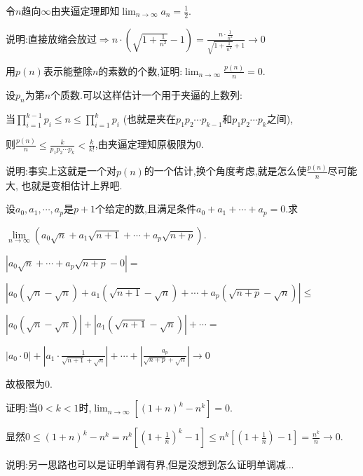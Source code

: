 \documentclass{exam}
\begin{document}
\begin{questions}
\begin{solution}
        令$n$趋向$\infty$由夹逼定理即知$\lim_{n\to\infty}a_n=\frac{1}{2}$.

        说明:直接放缩会放过$\Longrightarrow n\cdot\left(\sqrt{1+\frac{1}{n^2}}-1\right)=
        \frac{n\cdot\frac{1}{n^2}}{\sqrt{1+\frac{1}{n^2}}+1}\rightarrow 0$
    \end{solution}

    \question
    用$p(n)$表示能整除$n$的素数的个数,证明:$\lim _{n\to \infty}\frac{p(n)}{n}=0$.
    \begin{solution}
        设$p_n$为第$n$个质数.可以这样估计一个用于夹逼的上数列:

        当$\prod_{i=1}^{k-1}p_i\leqslant n\leqslant\prod_{i=1}^kp_i$
        (也就是夹在$p_1p_2\cdots p_{k-1}$和$p_1p_2\cdots p_k$之间),

        则$\frac{p(n)}{n}\leqslant \frac{k}{p_1p_2\cdots p_k}<\frac{k}{k!}$,由夹逼定理知原极限为0.

        说明:事实上这就是一个对$p(n)$的一个估计,换个角度考虑,就是怎么使$\frac{p(n)}{n}$尽可能大,
        也就是变相估计上界吧.
    \end{solution}
    
    \question
    设$a_0,a_1,\cdots,a_p$是$p+1$个给定的数,且满足条件$a_0+a_1+\cdots+a_p=0$.求

    $\lim\limits _{n\to \infty}\left(a_0\sqrt{n}+a_1\sqrt{n+1}+\cdots+a_p\sqrt{n+p}\right)$.
    \begin{solution}
        
        $\left|a_0\sqrt{n}+\cdots+a_p\sqrt{n+p}-0\right|=$

        $\left|a_0(\sqrt{n}-\sqrt{n})+a_1(\sqrt{n+1}-\sqrt{n})+\cdots+a_p(\sqrt{n+p}-\sqrt{n})\right|\leqslant$

        $\left|a_0(\sqrt{n}-\sqrt{n})\right|+\left|a_1(\sqrt{n+1}-\sqrt{n})\right|+\cdots=$

        $\left|a_0\cdot0\right|+\left|a_1\cdot\frac{1}{\sqrt{n+1}+\sqrt{n}}\right|+\cdots+\left|\frac{a_p}{\sqrt{n+p}+\sqrt{n}}\right|\to 0$

        故极限为0.
    \end{solution}

    

    \question
    证明:当$0<k<1$时,$\lim _{n\to\infty} \left[(1+n)^k-n^k\right]=0$.
    \begin{solution}
        显然$0\leqslant(1+n)^k-n^k=n^k\left[(1+\frac{1}{n})^k-1\right]\leqslant 
        n^k\left[(1+\frac{1}{n})-1\right]=\frac{n^k}{n}\to0$.

        说明:另一思路也可以是证明单调有界,但是没想到怎么证明单调减...
    \end{solution}


\end{questions}
\end{document}
